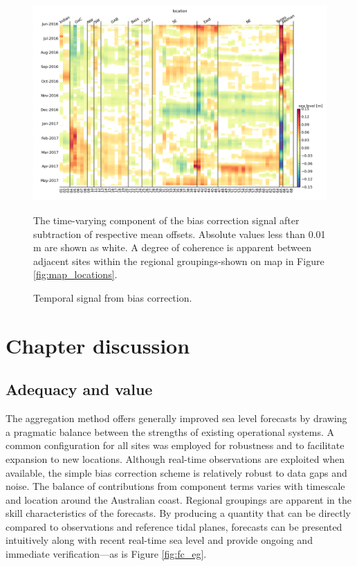 \begin{figure}[!hbt] \centering
    \includegraphics[width=1.0\textwidth]{figures/plots/aggSL_bias_breakdown_plot_2.png}
    \caption{Temporal signal from bias correction.}{The time-varying component of the bias correction signal after subtraction of respective mean offsets.  Absolute values less than 0.01 m are shown as white.  A degree of coherence is apparent between adjacent sites within the regional groupings-shown on map in Figure \ref{fig:map_locations}. } 
\label{fig:bias_time}
\end{figure}  


\section{Chapter discussion}
\subsection{Adequacy and value}
The aggregation method offers generally improved sea level forecasts by drawing a pragmatic balance between the strengths of existing operational systems.
A common configuration for all sites was employed for robustness and to facilitate expansion to new locations.  
Although real-time observations are exploited when available, the simple bias correction scheme is relatively robust to data gaps and noise. 
The balance of contributions from component terms varies with timescale and location around the Australian coast.
Regional groupings are apparent in the skill characteristics of the forecasts.
By producing a quantity that can be directly compared to observations and reference tidal planes, forecasts can be presented intuitively along with recent real-time sea level and provide ongoing and immediate verification---as is Figure \ref{fig:fc_eg}.

